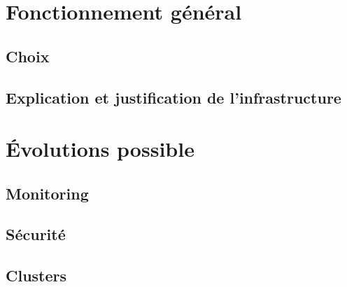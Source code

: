 \chapter{Fonctionnement général}
\section{Choix}
\section{Explication et justification de l'infrastructure}

\chapter{Évolutions possible}
\section{Monitoring}
\section{Sécurité}
\section{Clusters}
